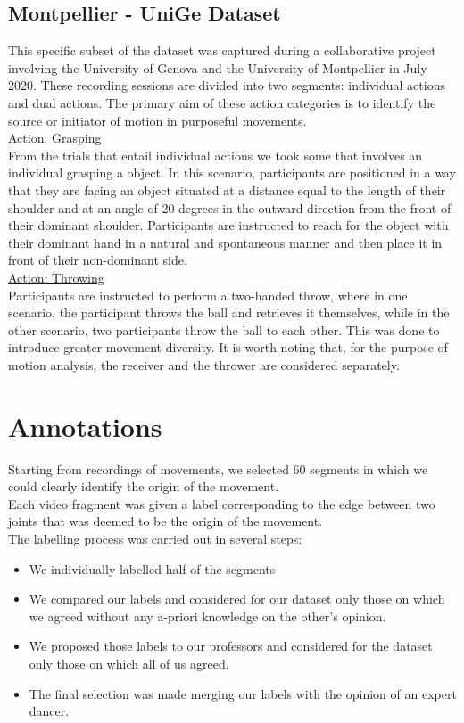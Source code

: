 \subsection{Montpellier - UniGe Dataset}
This specific subset of the dataset was captured during a collaborative project involving the University of Genova and the University of Montpellier in July 2020. 
These recording sessions are divided into two segments: individual actions and dual actions. 
The primary aim of these action categories is to identify the source or initiator of motion in purposeful movements.\\
\underline{Action: Grasping}\\
From the trials that entail individual actions we took some that involves an individual grasping a object. 
In this scenario, participants are positioned in a way that they are facing an object situated at a distance equal to the length 
of their shoulder and at an angle of 20 degrees in the outward direction from the front of their dominant shoulder. 
Participants are instructed to reach for the object with their dominant hand in a natural and spontaneous manner and then place it in front of their non-dominant side.\\
\underline{Action: Throwing}\\
Participants are instructed to perform a two-handed throw, where in one scenario, 
the participant throws the ball and retrieves it themselves, while in the other scenario, two participants throw the ball to each other. 
This was done to introduce greater movement diversity.
It is worth noting that, for the purpose of motion analysis, the receiver and the thrower are considered separately.

\section{Annotations}
Starting from recordings of movements, we selected 60 segments in which we could clearly identify the origin of the movement.\\
Each video fragment was given a label corresponding to the edge between two joints that was deemed to be the origin of the movement.\\
The labelling process was carried out in several steps:
\begin{itemize}
    \item{We individually labelled half of the segments}

    \item{We compared our labels and considered for our dataset only those on which we agreed without any a-priori knowledge on the other's opinion.}

    \item{We proposed those labels to our professors and considered for the dataset only those on which all of us agreed.}

    \item{The final selection was made merging our labels with the opinion of an expert dancer.}
\end{itemize}

